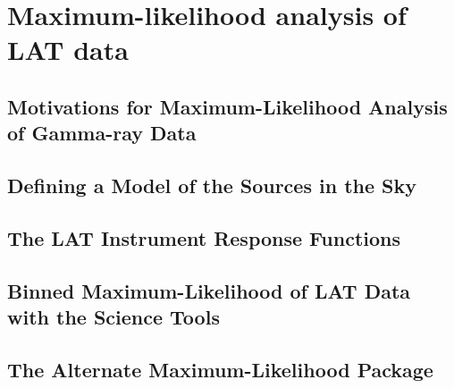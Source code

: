 \chapter{Maximum-likelihood analysis of LAT data}



\section{Motivations for Maximum-Likelihood Analysis of Gamma-ray Data}


\section{Defining a Model of the Sources in the Sky}


\section{The LAT Instrument Response Functions}


\section{Binned Maximum-Likelihood of LAT Data with the Science Tools}



\section{The Alternate Maximum-Likelihood Package \pointlike}

